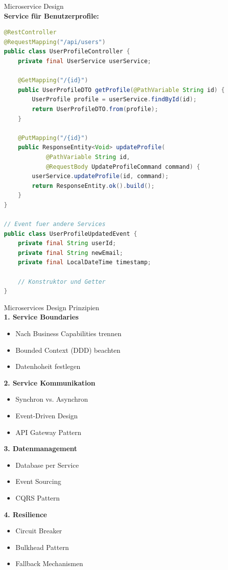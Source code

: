 \begin{example2}{Microservice Design}\\
\textbf{Service für Benutzerprofile:}

\begin{lstlisting}[language=Java, style=basesmol]
@RestController
@RequestMapping("/api/users")
public class UserProfileController {
    private final UserService userService;
    
    @GetMapping("/{id}")
    public UserProfileDTO getProfile(@PathVariable String id) {
        UserProfile profile = userService.findById(id);
        return UserProfileDTO.from(profile);
    }
    
    @PutMapping("/{id}")
    public ResponseEntity<Void> updateProfile(
            @PathVariable String id, 
            @RequestBody UpdateProfileCommand command) {
        userService.updateProfile(id, command);
        return ResponseEntity.ok().build();
    }
}

// Event fuer andere Services
public class UserProfileUpdatedEvent {
    private final String userId;
    private final String newEmail;
    private final LocalDateTime timestamp;
    
    // Konstruktor und Getter
}
\end{lstlisting}
\end{example2}

\begin{KR}{Microservices Design Prinzipien}\\
\textbf{1. Service Boundaries}
\begin{itemize}
    \item Nach Business Capabilities trennen
    \item Bounded Context (DDD) beachten
    \item Datenhoheit festlegen
\end{itemize}

\textbf{2. Service Kommunikation}
\begin{itemize}
    \item Synchron vs. Asynchron
    \item Event-Driven Design
    \item API Gateway Pattern
\end{itemize}

\textbf{3. Datenmanagement}
\begin{itemize}
    \item Database per Service
    \item Event Sourcing
    \item CQRS Pattern
\end{itemize}

\textbf{4. Resilience}
\begin{itemize}
    \item Circuit Breaker
    \item Bulkhead Pattern
    \item Fallback Mechanismen
\end{itemize}
\end{KR}

